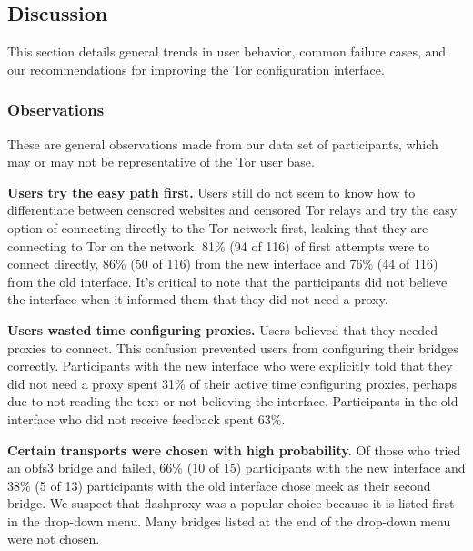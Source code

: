 \documentclass[USenglish,oneside,twocolumn]{article}
\begin{document}
\subsection{Discussion} 
This section details general trends in user behavior, common failure cases, and our recommendations for 
improving the Tor configuration interface. 

\subsubsection{Observations}
These are general observations made from our data set of participants, which may or may not be representative of the Tor user base.\\

\begin{description}
\item {\bfseries Users try the easy path first.} Users still do not seem to know how to differentiate between censored websites and censored Tor relays and try the easy option of connecting directly to the Tor network first, leaking that they are connecting to Tor on the network.  81\% (94 of 116) of first attempts were to connect directly, 86\% (50 of 116) from the new interface and 76\% (44 of 116) from the old interface. It's critical to note that the participants did not believe the interface when it informed them that they did not need a proxy.

\item {\bfseries Users wasted time configuring proxies.} Users believed that they needed proxies to connect. This confusion prevented users from configuring their bridges correctly. Participants with the new interface who were explicitly told that they did not need a proxy spent 31\% of their active time configuring proxies, perhaps due to not reading the text or not believing the interface. Participants in the old interface who did not receive feedback spent 63\%. 

\item {\bfseries Certain transports were chosen with high probability.}
Of those who tried an obfs3 bridge and failed, 
66\% (10 of 15) participants with the new interface and 38\% (5 of 13) participants with the old interface chose meek as their second bridge. We suspect that flashproxy was a popular choice because it is listed first in the drop-down menu. Many bridges listed at the end of the drop-down menu were not chosen. 


\end{description}
\end{document}
